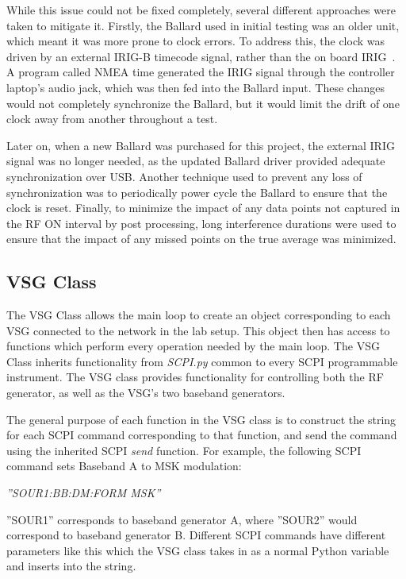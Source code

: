 While this issue could not be fixed completely, several different approaches were taken to mitigate it. Firstly, the Ballard used in initial testing was an older unit, which meant it was more prone to clock errors. To address this, the clock was driven by an external IRIG-B timecode signal, rather than the on board IRIG~\cite{noauthor_overview_2017}. A program called NMEA time generated the IRIG signal through the controller laptop's audio jack, which was then fed into the Ballard input.  These changes would not completely synchronize the Ballard, but it would limit the drift of one clock away from another throughout a test. 


Later on, when a new Ballard was purchased for this project, the external IRIG signal was no longer needed, as the updated Ballard driver provided adequate synchronization over USB. Another technique used to prevent any loss of synchronization was to periodically power cycle the Ballard to ensure that the clock is reset. Finally, to minimize the impact of any data points not captured in the RF ON interval by post processing, long interference durations were used to ensure that the impact of any missed points on the true average was minimized. 

\subsection{VSG Class}
The VSG Class allows the main loop to create an object corresponding to each VSG connected to the network in the lab setup. This object then has access to functions which perform every operation needed by the main loop. The VSG Class inherits functionality from \textit{SCPI.py} common to every SCPI programmable instrument. The VSG class provides functionality for controlling both the RF generator, as well as the VSG's two baseband generators. 

The general purpose of each function in the VSG class is to construct the string for each SCPI command corresponding to that function, and send the command using the inherited SCPI \textit{send} function. For example, the following SCPI command sets Baseband A to MSK modulation:
{\centering\textit{''SOUR1:BB:DM:FORM	MSK''}\par}
''SOUR1'' corresponds to baseband generator A, where ''SOUR2'' would correspond to baseband generator B. Different SCPI commands have different parameters like this which the VSG class takes in as a normal Python variable and inserts into the string. 

